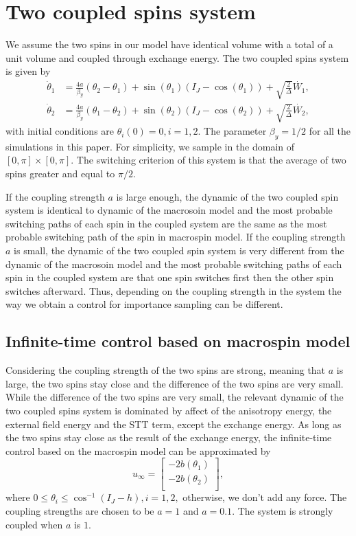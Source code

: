 \documentclass[journal,transmag]{IEEEtran}
\begin{document}
\section{Two coupled spins system}
We assume the two spins in our model have identical volume with a total of a unit volume and coupled through exchange energy.
The two coupled spins system is given by
\begin{align} \label{sys:N2}  \nonumber 
 \dot{\theta}_1 &=\frac{4a}{\beta_y}( \theta_{2} -  \theta_{1} ) +\sin(\theta_1)(I_J - \cos(\theta_1)) + \sqrt{\frac{2}{{\Delta}}}\dot{W_1},\\  \nonumber
  \dot{\theta}_2 &=\frac{4a}{\beta_y}( \theta_{1} -  \theta_{2} ) +\sin(\theta_2)(I_J - \cos(\theta_2))+ \sqrt{ \frac{2}{{\Delta}}}\dot{W_2}, 
 \end{align}
with initial conditions are $\theta_i(0) = 0, i = 1,2.$ The parameter $\beta_y = 1/2$ for all the simulations in this paper. For simplicity, we sample in the domain of $[0,\pi] \times [0,\pi]$. The switching criterion of this system is that the average of two spins greater and equal to $\pi/2$.  

If the coupling strength $a$ is large enough, the dynamic of the two coupled spin system is identical to dynamic of the macrosoin model and the most probable switching paths of each spin in the coupled system are the same as the most probable switching path of the spin in macrospin model. If the coupling strength $a$ is small, the dynamic of the two coupled spin system is very different from the dynamic of the macrosoin model and the most probable switching paths of each spin in the coupled system are that one spin switches first then the other spin switches afterward. Thus, depending on the coupling strength in the system the way we obtain a control for importance sampling can be different. 
%
%
\subsection{Infinite-time control based on macrospin model}
Considering the coupling strength of the two spins are strong, meaning that $a$ is large, the two spins stay close and the difference of the two spins are very small. While the difference of the two spins are very small, the relevant dynamic of the two coupled spins system is dominated by affect of the anisotropy energy, the external field energy and the STT term, except the exchange energy. As long as the two spins stay close as the result of the exchange energy, the infinite-time control based on the macrospin model can be approximated by 
 \begin{equation} 
u_\infty= \left[ \begin {array}{c}
 -2b(\theta_1)\\ 
 -2b(\theta_2)\\
 \end {array}
 \right], 
 \end{equation}
 where $ 0 \leqslant \theta_i \leqslant \cos^{-1}(I_J-h) , i = 1,2,$ otherwise, we don't add any force. The coupling strengths are chosen to be $ a = 1$ and $a = 0.1$. The system is strongly coupled when $a$ is $1$. 
\end{document}
